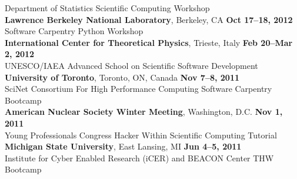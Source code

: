 \documentclass[margin,line]{resume}
\begin{document}
\begin{resume}
    Department of Statistics Scientific Computing Workshop
               \vspace{2mm}\\
    \textbf{Lawrence Berkeley National Laboratory}, Berkeley, CA \hfill \textbf{Oct 17--18, 2012}\\
    Software Carpentry Python Workshop
               \vspace{2mm}\\
    \textbf{International Center for Theoretical Physics}, Trieste, Italy \hfill \textbf{Feb 20--Mar 2, 2012}\\
    UNESCO/IAEA Advanced School on Scientific Software Development
               \vspace{2mm}\\
    \textbf{University of Toronto}, Toronto, ON, Canada \hfill \textbf{Nov 7--8, 2011}\\
    SciNet Consortium For High Performance Computing Software Carpentry Bootcamp
               \vspace{2mm}\\
    \textbf{American Nuclear Society Winter Meeting}, Washington, D.C.  \hfill \textbf{Nov 1, 2011}\\
    Young Professionals Congress Hacker Within Scientific Computing Tutorial
               \vspace{2mm}\\
    \textbf{Michigan State University}, East Lansing, MI \hfill \textbf{Jun 4--5, 2011}\\
    Institute for Cyber Enabled Research (iCER) and BEACON Center THW Bootcamp


\end{resume}
\end{document}
